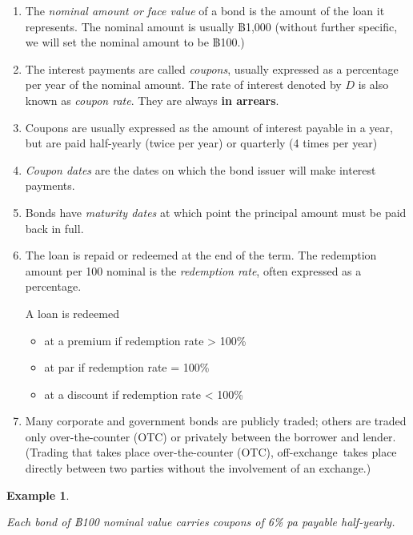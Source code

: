 \documentclass[landscape, 20pt]{extreport}
\theoremstyle{definition}
\theoremstyle{definition}
\newtheorem{example}{Example}[chapter]
\theoremstyle{definition}
\theoremstyle{definition}
\theoremstyle{remark}
\begin{document}
\begin{enumerate}
\def\labelenumi{\arabic{enumi}.}
\item
  The \emph{nominal amount or face value} of a bond is the amount of the
  loan it represents. The nominal amount is usually ฿1,000 (without
  further specific, we will set the nominal amount to be ฿100.)
\item
  The interest payments are called \emph{coupons}, usually expressed as a
  percentage per year of the nominal amount. The rate of interest
  denoted by \(D\) is also known as \emph{coupon rate}. They are always \textbf{in
  arrears}.
\item
  Coupons are usually expressed as the amount of interest payable in a
  year, but are paid half-yearly (twice per year) or quarterly (4
  times per year)
\item
  \emph{Coupon dates} are the dates on which the bond issuer will make
  interest payments.
\item
  Bonds have \emph{maturity dates} at which point the principal amount must
  be paid back in full.
\item
  The loan is repaid or redeemed at the end of the term. The
  redemption amount per 100 nominal is the \emph{redemption rate}, often
  expressed as a percentage.

  A loan is redeemed

  \begin{itemize}
  \item
    at a premium if redemption rate \textgreater{} 100\%
  \item
    at par if redemption rate = 100\%
  \item
    at a discount if redemption rate \textless{} 100\%
  \end{itemize}
\item
  Many corporate and government bonds are publicly traded; others are
  traded only over-the-counter (OTC) or privately between the borrower
  and lender. (Trading that takes place over-the-counter (OTC), off-exchange takes place directly between two parties without the involvement of an exchange.)
\end{enumerate}

\newpage \begin{example}
\protect\hypertarget{exm:unlabeled-div-46}{}\label{exm:unlabeled-div-46}

\emph{Each bond of ฿100 nominal value carries coupons of 6\%
pa payable half-yearly.}

\end{example}
\end{document}
